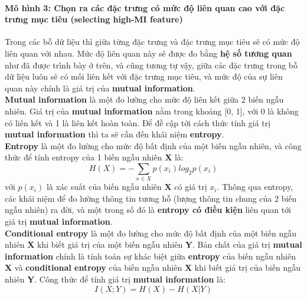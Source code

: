 \documentclass{report}
\begin{document}
    \paragraph{Mô hình 3: Chọn ra các đặc trưng có mức độ liên quan cao với đặc trưng mục tiêu (selecting high-MI feature)}\label{sec:selecting-MI-feature}
    Trong các bỗ dữ liệu thì giữa từng đặc trưng và đặc trưng mục tiêu sẽ có mức độ liên quan với nhau. Mức độ liên quan này sẽ được đo bằng \textbf{hệ số tương quan} như đã được trình bày ở trên, và cũng tương tự vậy, giữa các đặc trưng trong bỗ dữ liệu luôn sẽ có mối liên kết với đặc trưng mục tiêu, và mức độ của sự liên quan này chính là giá trị của \textbf{mutual information}.\\

    \textbf{Mutual information} là một đo lường cho mức độ liên kết giữa 2 biến ngẫu nhiên. Giá trị của \textbf{mutual information} nằm trong khoảng [0, 1], với 0 là không có liên kết và 1 là liên kết hoàn toàn. Để đề cập tới cách thức tính giá trị \textbf{mutual information} thì ta sẽ cần đến khái niệm \textbf{entropy}.\\

    \textbf{Entropy} là một đo lường cho mức độ bất định của một biến ngẫu nhiên, và công thức để tính entropy của 1 biến ngẫu nhiên \textbf{X} là:
    \begin{equation}
        H(X) = -\sum_{x\in X}p(x_i)log_2p(x_i)
    \end{equation}
    với $p(x_i)$ là xác suất của biến ngẫu nhiên \textbf{X} có giá trị $x_i$. Thông qua entropy, các khái niệm để đo lường thông tin tương hỗ (lượng thông tin chung của 2 biến ngẫu nhiên) ra đời, và một trong số đó là \textbf{entropy có điều kiện} liên quan tới giá trị \textbf{mutual information}.\\
    
    \textbf{Conditional entropy} là một đo lường cho mức độ bất định của một biến ngẫu nhiên \textbf{X} khi biết giá trị của một biến ngẫu nhiên \textbf{Y}. Bản chất của giá trị \textbf{mutual information} chính là tính toán sự khác biệt giữa \textbf{entropy} của biến ngẫu nhiên \textbf{X} và \textbf{conditional entropy} của biến ngẫu nhiên \textbf{X} khi biết giá trị của biến ngẫu nhiên \textbf{Y}. Công thức để tính giá trị \textbf{mutual information} là:
    \begin{equation}
        I(X;Y) = H(X) - H(X|Y)
    \end{equation}
\end{document}
